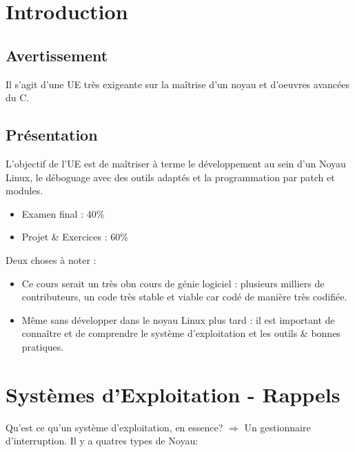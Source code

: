 \section{Introduction}

\subsection{Avertissement}
Il s'agit d'une UE très exigeante sur la maîtrise d'un noyau et d'oeuvres avancées
du C.

\subsection{Présentation}
L'objectif de l'UE est de maîtriser à terme le développement au sein d'un Noyau
Linux, le déboguage avec des outils adaptés et la programmation par patch et
modules.

\begin{itemize}
  \item Examen final : 40\%
  \item Projet \& Exercices : 60\%
\end{itemize}

Deux choses à noter :
\begin{itemize}
  \item Ce cours serait un très obn cours de génie logiciel : plusieurs milliers de
contributeurs, un code très stable et viable car codé de manière très codifiée.
  \item Même sans développer dans le noyau Linux plus tard : il est important de
connaître et de comprendre le système d'exploitation et les outils \& bonnes
pratiques.
\end{itemize}
\section{Systèmes d'Exploitation - Rappels}
Qu'est ce qu'un système d'exploitation, en essence? $\Rightarrow$ Un gestionnaire
d'interruption.
Il y a quatres types de Noyau:

